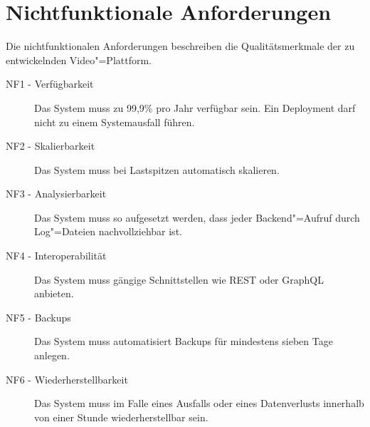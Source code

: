 \section{Nichtfunktionale Anforderungen}

Die nichtfunktionalen Anforderungen beschreiben die Qualitätsmerkmale der zu entwickelnden Video"=Plattform.

\begin{description}
   \item[NF1 - Verfügbarkeit] Das System muss zu 99,9\% pro Jahr verfügbar sein. Ein Deployment darf nicht zu einem Systemausfall führen.\label{NF1}
   \item[NF2 - Skalierbarkeit] Das System muss bei Lastspitzen automatisch skalieren.\label{NF2}
   \item[NF3 - Analysierbarkeit] Das System muss so aufgesetzt werden, dass jeder Backend"=Aufruf durch Log"=Dateien nachvollziehbar ist.\label{NF3}
   \item[NF4 - Interoperabilität] Das System muss gängige Schnittstellen wie REST oder GraphQL anbieten.\label{NF4}
   \item[NF5 - Backups] Das System muss automatisiert Backups für mindestens sieben Tage anlegen.\label{NF6}
   \item[NF6 - Wiederherstellbarkeit] Das System muss im Falle eines Ausfalls oder eines Datenverlusts innerhalb von einer Stunde wiederherstellbar sein.\label{NF7}
\end{description}